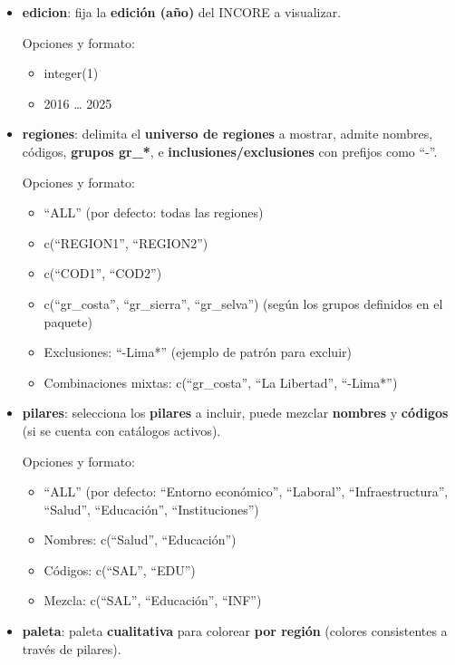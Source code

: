 \documentclass[
  11pt,
  letterpaper,
  DIV=11,
  numbers=noendperiod]{scrartcl}
\begin{document}
\begin{itemize}
\item
  \textbf{edicion}: fija la \textbf{edición (año)} del INCORE a
  visualizar.

  Opciones y formato:

  \begin{itemize}
  \item
    integer(1)
  \item
    2016 \ldots{} 2025
  \end{itemize}
\item
  \textbf{regiones}: delimita el \textbf{universo de regiones} a
  mostrar, admite nombres, códigos, \textbf{grupos gr\_*}, e
  \textbf{inclusiones/exclusiones} con prefijos como ``-''.

  Opciones y formato:

  \begin{itemize}
  \item
    ``ALL'' (por defecto: todas las regiones)
  \item
    c(``REGION1'', ``REGION2'')
  \item
    c(``COD1'', ``COD2'')
  \item
    c(``gr\_costa'', ``gr\_sierra'', ``gr\_selva'') (según los grupos
    definidos en el paquete)
  \item
    Exclusiones: ``-Lima*'' (ejemplo de patrón para excluir)
  \item
    Combinaciones mixtas: c(``gr\_costa'', ``La Libertad'', ``-Lima*'')
  \end{itemize}
\item
  \textbf{pilares}: selecciona los \textbf{pilares} a incluir, puede
  mezclar \textbf{nombres} y \textbf{códigos} (si se cuenta con
  catálogos activos).

  Opciones y formato:

  \begin{itemize}
  \item
    ``ALL'' (por defecto: ``Entorno económico'', ``Laboral'',
    ``Infraestructura'', ``Salud'', ``Educación'', ``Instituciones'')
  \item
    Nombres: c(``Salud'', ``Educación'')
  \item
    Códigos: c(``SAL'', ``EDU'')
  \item
    Mezcla: c(``SAL'', ``Educación'', ``INF'')
  \end{itemize}
\item
  \textbf{paleta}: paleta \textbf{cualitativa} para colorear \textbf{por
  región} (colores consistentes a través de pilares).


\end{itemize}
\end{document}
